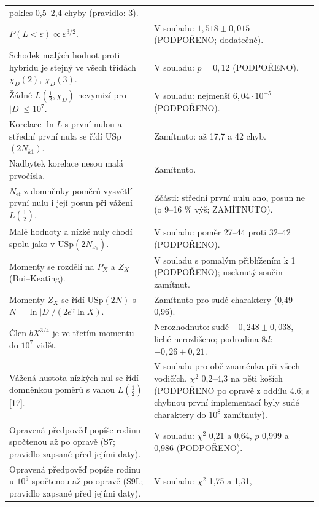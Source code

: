 \documentclass[
  10pt,
]{article}
\begin{document}
{\begin{longtable}[]{@{}
  >{\raggedright\arraybackslash}p{}
  >{\raggedright\arraybackslash}p{}@{}}
pokles 0,5--2,4 chyby (pravidlo: 3). \\ \addlinespace[2pt]
\(P(L < \varepsilon) \propto \varepsilon^{3/2}\). & V souladu:
\(1{,}518 \pm 0{,}015\) (PODPOŘENO; dodatečně). \\ \addlinespace[2pt]
Schodek malých hodnot proti hybridu je stejný ve všech třídách
\(\chi_D(2)\), \(\chi_D(3)\). & V souladu: \(p = 0{,}12\)
(PODPOŘENO). \\ \addlinespace[2pt]
Žádné \(L(\tfrac12, \chi_D)\) nevymizí pro \(|D| \le 10^7\). & V
souladu: nejmenší \(6{,}04\cdot10^{-5}\) (PODPOŘENO). \\ \addlinespace[2pt]
Korelace \(\ln L\) s první nulou a střední první nula se řídí
USp\((2N_{k1})\). & Zamítnuto: až 17,7 a 42 chyb. \\ \addlinespace[2pt]
Nadbytek korelace nesou malá prvočísla. & Zamítnuto. \\ \addlinespace[2pt]
\(N_{\mathrm{ef}}\) z domněnky poměrů vysvětlí první nulu i její posun
při vážení \(L(\tfrac12)\). & Zčásti: střední první nulu ano, posun ne
(o 9--16 \% výš; ZAMÍTNUTO). \\ \addlinespace[2pt]
Malé hodnoty a nízké nuly chodí spolu jako v USp\((2N_{x_1})\). & V
souladu: poměr 27--44 proti 32--42 (PODPOŘENO). \\ \addlinespace[2pt]
Momenty se rozdělí na \(P_X\) a \(Z_X\) (Bui--Keating). & V souladu s
pomalým přiblížením k 1 (PODPOŘENO); useknutý součin zamítnut. \\ \addlinespace[2pt]
Momenty \(Z_X\) se řídí USp\((2N)\) s \(N = \ln|D|/(2e^\gamma\ln X)\). &
Zamítnuto pro sudé charaktery (0,49--0,96). \\ \addlinespace[2pt]
Člen \(bX^{3/4}\) je ve třetím momentu do \(10^7\) vidět. &
Nerozhodnuto: sudé \(-0{,}248 \pm 0{,}038\), liché nerozlišeno;
podrodina \(8d\): \(-0{,}26 \pm 0{,}21\). \\ \addlinespace[2pt]
Vážená hustota nízkých nul se řídí domněnkou poměrů s vahou
\(L(\tfrac12)\) {[}17{]}. & V souladu pro obě znaménka při všech
vodičích, \(\chi^2\) 0,2--4,3 na pěti koších (PODPOŘENO po opravě z
oddílu 4.6; s chybnou první implementací byly sudé charaktery do
\(10^8\) zamítnuty). \\ \addlinespace[2pt]
Opravená předpověď popíše rodinu spočtenou až po opravě (S7; pravidlo
zapsané před jejími daty). & V souladu: \(\chi^2\) 0,21 a 0,64, \(p\)
0,999 a 0,986 (PODPOŘENO). \\ \addlinespace[2pt]
Opravená předpověď popíše rodinu u \(10^9\) spočtenou až po opravě (S9L;
pravidlo zapsané před jejími daty). & V souladu: \(\chi^2\) 1,75 a 1,31,

\end{longtable}}
\end{document}
